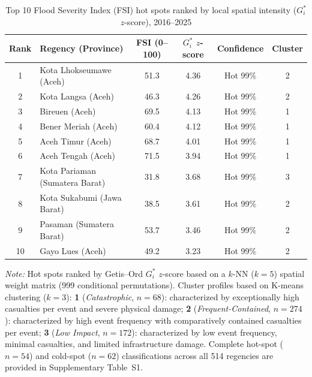 \begin{table}[htbp]
\caption{Top 10 Flood Severity Index (FSI) hot spots ranked by local spatial intensity ($G_i^{*}$ $z$-score), 2016--2025}
\label{tab:gi_hotspots}
\centering
\footnotesize
\setlength{\tabcolsep}{0pt}
\begin{tabular*}{\textwidth}{@{\extracolsep{\fill}}clcccc@{}}
\toprule
\textbf{Rank} & \textbf{Regency (Province)} & \textbf{FSI (0--100)} & \textbf{$G_i^{*}$ $z$-score} & \textbf{Confidence} & \textbf{Cluster} \\
\midrule
1  & Kota Lhokseumawe (Aceh)          & 51.3 & 4.36 & Hot 99\% & 2 \\
2  & Kota Langsa (Aceh)               & 46.3 & 4.26 & Hot 99\% & 2 \\
3  & Bireuen (Aceh)                   & 69.5 & 4.13 & Hot 99\% & 1 \\
4  & Bener Meriah (Aceh)              & 60.4 & 4.12 & Hot 99\% & 1 \\
5  & Aceh Timur (Aceh)                & 68.7 & 4.01 & Hot 99\% & 1 \\
6  & Aceh Tengah (Aceh)               & 71.5 & 3.94 & Hot 99\% & 1 \\
7  & Kota Pariaman (Sumatera Barat)   & 31.8 & 3.68 & Hot 99\% & 3 \\
8  & Kota Sukabumi (Jawa Barat)       & 38.5 & 3.61 & Hot 99\% & 2 \\
9  & Pasaman (Sumatera Barat)         & 53.7 & 3.46 & Hot 99\% & 2 \\
10  & Gayo Lues (Aceh)                 & 49.2 & 3.23 & Hot 99\% & 2 \\
\bottomrule
\end{tabular*}
\vspace{4pt}
\begin{minipage}{\textwidth}
\footnotesize\setlength{\parindent}{0pt}%
\textit{Note:} Hot spots ranked by Getis--Ord $G_i^{*}$ $z$-score based on a $k$-NN ($k=5$) spatial weight matrix (999 conditional permutations). 
Cluster profiles based on K-means clustering ($k=3$): 
\textbf{1} (\emph{Catastrophic}, $n=68$): characterized by exceptionally high casualties per event and severe physical damage; 
\textbf{2} (\emph{Frequent-Contained}, $n=274$): characterized by high event frequency with comparatively contained casualties per event; 
\textbf{3} (\emph{Low Impact}, $n=172$): characterized by low event frequency, minimal casualties, and limited infrastructure damage. 
Complete hot-spot ($n=54$) and cold-spot ($n=62$) classifications across all 514 regencies are provided in Supplementary Table~S1.
\end{minipage}
\end{table}
